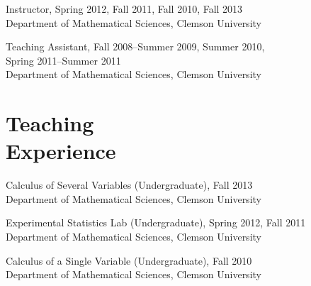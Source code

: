 \documentclass[margin,line,pifont,palatino,courier]{res}
\newenvironment{list1}{
  \begin{list}{\ding{113}}{%
      \setlength{\itemsep}{0in}
      \setlength{\parsep}{0in} \setlength{\parskip}{0in}
      \setlength{\topsep}{0in} \setlength{\partopsep}{0in}
      \setlength{\leftmargin}{0.17in}}}{\end{list}}
\begin{document}
\begin{resume}
Instructor, Spring 2012, Fall 2011, Fall 2010, Fall 2013 \\
Department of Mathematical Sciences, Clemson University

Teaching Assistant, Fall 2008--Summer 2009, Summer 2010, \\
Spring 2011--Summer 2011 \\
Department of Mathematical Sciences, Clemson University

\newpage
\section{\sc Teaching \\ Experience}

Calculus of Several Variables (Undergraduate), Fall 2013  \\
Department of Mathematical Sciences, Clemson University

Experimental Statistics Lab (Undergraduate), Spring 2012, Fall 2011 \\
Department of Mathematical Sciences, Clemson University

Calculus of a Single Variable (Undergraduate), Fall 2010 \\
Department of Mathematical Sciences, Clemson University









\end{resume}
\end{document}
